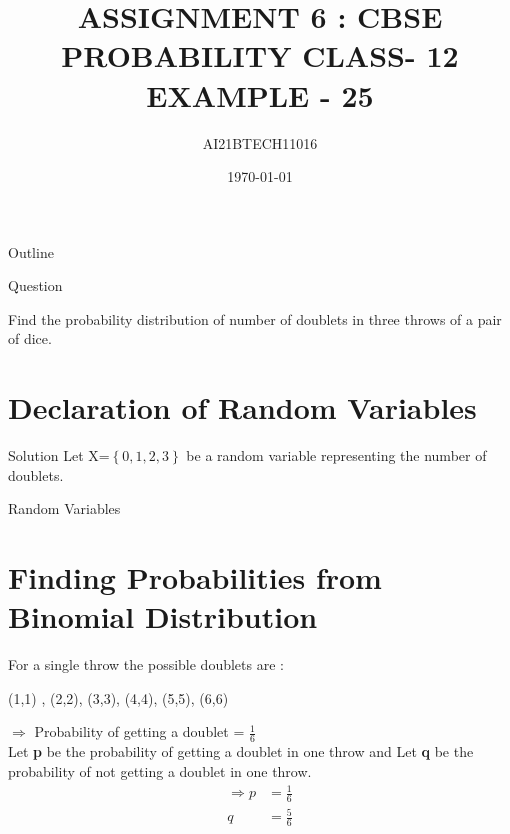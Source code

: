 \documentclass{beamer}
\title{ASSIGNMENT 6 : CBSE PROBABILITY CLASS- 12  EXAMPLE - 25}
\author{AI21BTECH11016}
\date{\today}
\providecommand{\cbrak}[1]{\ensuremath{\left\{#1\right\}}}
\begin{document}
\begin{frame}
    \titlepage 
\end{frame}

\logo{}

\begin{frame}{Outline}
    \tableofcontents
\end{frame}

\begin{frame}{Question}
\begin{block}{}
Find the probability distribution of number of doublets in three throws of
a pair of dice.
\end{block}
\end{frame}

\section{Declaration of Random Variables}
\begin{frame}{Solution}
Let X=\cbrak{0,1,2,3} be a random variable representing the number of doublets.\\

\begin{table}[ht!]
    \centering
    
    \caption{Random Variables}
    \label{Tab:Table1}
\end{table}
\end{frame}

\section{Finding Probabilities from Binomial Distribution}

\begin{frame}
\text For a single throw the possible doublets are :
\begin{center}
\text (1,1) , (2,2), (3,3), (4,4), (5,5), (6,6)\\
\end{center}
\item $\Rightarrow$ Probability of getting a doublet = $\frac{1}{6}$\\
Let \textbf{p} be the probability of getting a doublet in one throw and Let \textbf{q} be the probability of not getting a doublet in one throw.\\ 
\centering
\begin{align}
\Rightarrow p & = \frac{1}{6}\\
q & = \frac{5}{6}
\end{align}
\end{frame}
\end{document}
